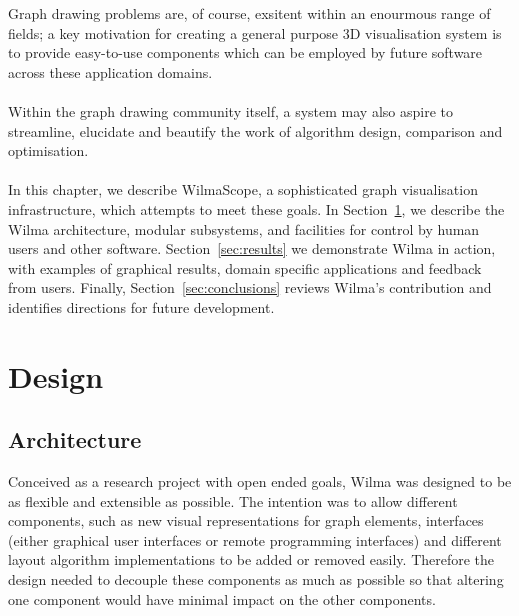 \documentclass[runningheads]{cl2emult}
\begin{document}
Graph drawing problems are, of course, exsitent within an enourmous range of
fields; a key motivation for creating a general purpose 3D visualisation
system is to provide easy-to-use components which can be employed by future
software across these application domains.

\paragraph{}

Within the graph drawing community itself, a system may also aspire to 
streamline, elucidate and beautify the work of algorithm design, comparison
and optimisation.

\paragraph{}

In this chapter, we describe WilmaScope, a sophisticated graph visualisation
infrastructure, which attempts to meet these goals.  In
Section~\ref{sec:design}, we describe the Wilma architecture, modular
subsystems, and facilities for control by human users and other software.
Section~\ref{sec:results} we demonstrate Wilma in action, with examples of
graphical results, domain specific applications and feedback from users.
Finally, Section~\ref{sec:conclusions} reviews Wilma's contribution and
identifies directions for future development.

\section{Design}\label{sec:design}
\subsection{Architecture}
Conceived as a research project with open ended goals, Wilma was
designed to be as flexible and extensible as possible.  The intention
was to allow different components, such as new visual representations
for graph elements, interfaces (either graphical user interfaces or
remote programming interfaces) and different 
layout algorithm implementations to be added or removed easily.
Therefore the design needed to decouple these components as much as
possible so that altering one component would have minimal impact on
the other components.

\paragraph{}
\end{document}
